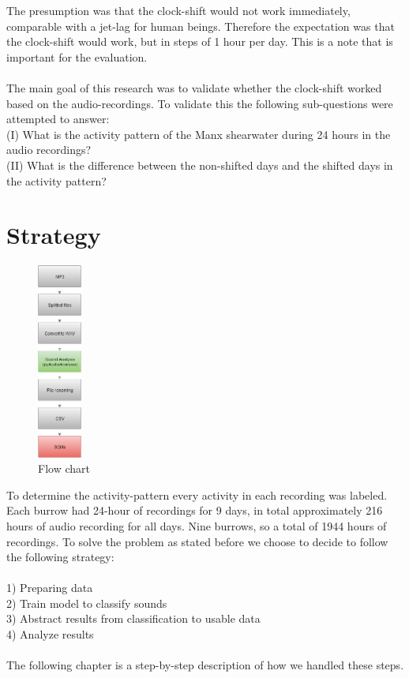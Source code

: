 \documentclass[a4paper]{article}
\begin{document}
The presumption was that the clock-shift would not work immediately, comparable with a jet-lag for human beings. Therefore the expectation was that the clock-shift would work, but in steps of 1 hour per day. This is a note that is important for the evaluation.\\\\
The main goal of this research was to validate whether the clock-shift worked based on the audio-recordings. To validate this the following sub-questions were attempted to answer:\\
 (I)    What is the activity pattern of the Manx shearwater during 24 hours in the audio recordings? \\
 (II)   What is the difference between the non-shifted days and the shifted days in the activity pattern?
 
\section*{Strategy}
\begin{figure}
\vspace{-23pt}
  \begin{center}
    \includegraphics[width=0.13\textwidth]{diagram}
  \end{center}
  \vspace{-20pt}
  \caption{Flow chart}
\end{figure}
To determine the activity-pattern every activity in each recording was labeled. Each burrow had 24-hour of recordings for 9 days, in total approximately 216 hours of audio recording for all days. Nine burrows, so a total of 1944 hours of recordings. To solve the problem as stated before we choose to decide to follow the following strategy:\\\\
1) Preparing data \\
2) Train model to classify sounds \\
3) Abstract results from classification to usable data\\
4) Analyze results\\\\
The following chapter is a step-by-step description of how we handled these steps. 
\end{document}
